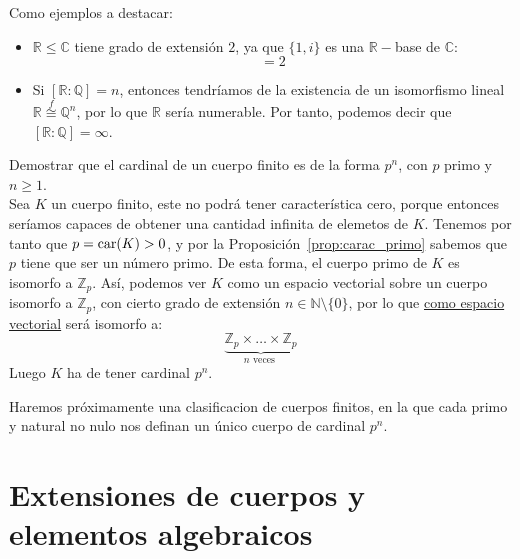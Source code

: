 \begin{ejemplo}
    Como ejemplos a destacar:
    \begin{itemize}
        \item $\mathbb{R}\leq \mathbb{C}$ tiene grado de extensión $2$, ya que $\{1,i\}$ es una $\mathbb{R}-$base de $\mathbb{C}$:
            \begin{equation*}
                [\mathbb{C}:\mathbb{R}] = 2
            \end{equation*}
        \item Si $[\mathbb{R}:\mathbb{Q}] = n$, entonces tendríamos de la existencia de un isomorfismo lineal $\mathbb{R}\stackrel{f}{\cong} \mathbb{Q}^n$, por lo que $\mathbb{R}$ sería numerable. Por tanto, podemos decir que $[\mathbb{R}:\mathbb{Q}]=\infty$.
    \end{itemize}
\end{ejemplo}

\begin{ejercicio}\label{ej:cardinal_cuerpo}
    Demostrar que el cardinal de un cuerpo finito es de la forma $p^n$, con $p$ primo y $n\geq 1$.\\

    \noindent
    Sea $K$ un cuerpo finito, este no podrá tener característica cero, porque entonces seríamos capaces de obtener una cantidad infinita de elemetos de $K$. Tenemos por tanto que $p = \operatorname{car}(K) > 0$, y por la Proposición~\ref{prop:carac_primo} sabemos que $p$ tiene que ser un número primo. De esta forma, el cuerpo primo de $K$ es isomorfo a $\mathbb{Z}_p$. Así, podemos ver $K$ como un espacio vectorial sobre un cuerpo isomorfo a $\mathbb{Z}_p$, con cierto grado de extensión $n\in \mathbb{N}\setminus \{0\}$, por lo que \underline{como espacio vectorial} será isomorfo a:
    \begin{equation*}
        \underbrace{\mathbb{Z}_p\times \ldots \times \mathbb{Z}_p}_{n\text{ veces }}
    \end{equation*}
    Luego $K$ ha de tener cardinal $p^n$.
\end{ejercicio}

\noindent
Haremos próximamente una clasificacion de cuerpos finitos, en la que cada primo y natural no nulo nos definan un único cuerpo de cardinal $p^n$.

\section{Extensiones de cuerpos y elementos algebraicos}

